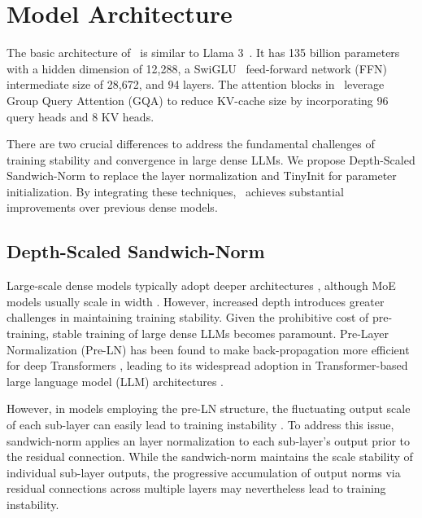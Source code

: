 \section{Model Architecture}


The basic architecture of \modelname~is similar to Llama 3~\cite{grattafiori2024llama}. It has 135 billion parameters with a hidden dimension of 12,288, a SwiGLU~\cite{shazeer2020glu} feed-forward network (FFN) intermediate size of 28,672, and 94 layers. The attention blocks in \modelname~leverage Group Query Attention (GQA) to reduce KV-cache size by incorporating 96 query heads and 8 KV heads.

There are two crucial differences to address the fundamental challenges of training stability and convergence in large dense LLMs. We propose Depth-Scaled Sandwich-Norm to replace the layer normalization and TinyInit for parameter initialization. By integrating these techniques, \modelname~achieves substantial improvements over previous dense models.


\subsection{Depth-Scaled Sandwich-Norm}

Large-scale dense models typically adopt deeper architectures \cite{dubey2024llama}, although MoE models usually scale in width \cite{deepseekv3}. However, increased depth introduces greater challenges in maintaining training stability. 
Given the prohibitive cost of pre-training, stable training of large dense LLMs becomes paramount.
Pre-Layer Normalization (Pre-LN) has been found to make back-propagation more efficient for deep Transformers \cite{wang2019learning-deep}, leading to its widespread adoption in Transformer-based large language model (LLM) architectures \cite{dubey2024llama,bai2023qwen,deepseekv3}.



However, in models employing the pre-LN structure, the fluctuating output scale of each sub-layer can easily lead to training instability \cite{takase2024spikemore}.
To address this issue, sandwich-norm \cite{NEURIPS2021_CogView} applies an layer normalization to each sub-layer's output prior to the residual connection. While the sandwich-norm maintains the scale stability of individual sub-layer outputs, the progressive accumulation of output norms via residual connections across multiple layers may nevertheless lead to training instability.

